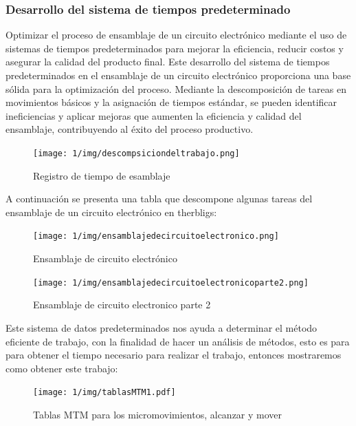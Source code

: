     
    \subsubsection{Desarrollo del sistema de tiempos predeterminado}
    
    Optimizar el proceso de ensamblaje de un circuito electrónico mediante el uso de sistemas de tiempos predeterminados para mejorar la eficiencia, reducir costos y asegurar la calidad del producto final.
    Este desarrollo del sistema de tiempos predeterminados en el ensamblaje de un circuito electrónico proporciona una base sólida para la optimización del proceso. Mediante la descomposición de tareas en movimientos básicos y la asignación de tiempos estándar, se pueden identificar ineficiencias y aplicar mejoras que aumenten la eficiencia y calidad del ensamblaje, contribuyendo al éxito del proceso productivo.
    
    \begin{figure}[H]
        \centering
    \texttt{[image: 1/img/descompsiciondeltrabajo.png]}
        \caption{Registro de tiempo de esamblaje}
    \end{figure}
    
    A continuación se presenta una tabla que descompone algunas tareas del ensamblaje de un circuito electrónico en therbligs:
    \begin{figure}[H]
        \centering
        \texttt{[image: 1/img/ensamblajedecircuitoelectronico.png]}
        \caption{Ensamblaje de circuito electrónico}
    \end{figure}
    
    
    \begin{figure}[H]
        \centering
        \texttt{[image: 1/img/ensamblajedecircuitoelectronicoparte2.png]}
        \caption{Ensamblaje de circuito electronico parte 2}
    \end{figure}
    Este sistema de datos predeterminados nos ayuda a determinar el método eficiente de trabajo, con la finalidad de hacer un análisis de métodos, esto es para para obtener el tiempo necesario para realizar el trabajo, entonces mostraremos como obtener este trabajo:
    
     \begin{figure}[H]
            \centering
            \texttt{[image: 1/img/tablasMTM1.pdf]}
            \caption{Tablas MTM para los micromovimientos, alcanzar y mover}
            \label{tablasMTM1}
        \end{figure}
    
